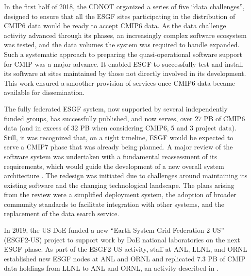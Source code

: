 \documentclass[manuscript]{copernicus}
\def\cred#1{{\color{red}#1}}
\begin{document}
In the first half of 2018, the CDNOT organized a series of five ``data challenges'', designed to ensure that all the ESGF sites participating in the distribution of CMIP6 data would be ready to accept CMIP6 data. As the data challenge activity advanced through its phases, an increasingly complex software ecosystem was tested, and the data volumes the system was required to handle expanded. Such a systematic approach to preparing the quasi-operational software support for CMIP was a major advance. It enabled ESGF to successfully test and install its software at sites maintained by those not directly involved in its development. This work ensured a smoother provision of services once CMIP6 data became available for dissemination.

The fully federated ESGF system, now supported by several independently funded groups, has successfully published, and now serves, over 27 PB of CMIP6 data (and in excess of 32 PB when considering CMIP6, 5 and 3 project data). Still, it was recognized that, on a tight timeline, ESGF would be expected to serve a CMIP7 phase that was already being planned. A major review of the software system was undertaken with a fundamental reassessment of its requirements, which would guide the development of a new overall system architecture \citep{kershaw_esgf_2020}. The redesign was initiated due to challenges around maintaining its existing software and the changing technological landscape. The plans arising from the review were a simplified deployment system, the adoption of broader community standards to facilitate integration with other systems, and the replacement of the data search service.

In 2019, the US DoE funded a new ``Earth System Grid Federation 2 US'' (ESGF2-US) project to support work by DoE national laboratories on the next ESGF phase. As part of the ESGF2-US activity, staff at ANL, LLNL, and ORNL established new ESGF nodes at ANL and ORNL and replicated 7.3 PB of CMIP data holdings from LLNL to ANL and ORNL, an activity described in \cite{lacinski2024automated}.


\end{document}
